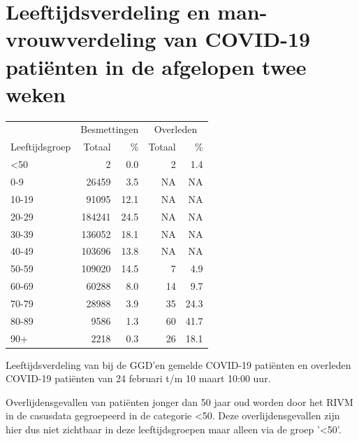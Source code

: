 \documentclass[
  english,
  man,floatsintext]{apa6}
\begin{document}
\newpage

\hypertarget{leeftijdsverdeling-en-man-vrouwverdeling-van-covid-19-patiuxebnten-in-de-afgelopen-twee-weken}{%
\section{Leeftijdsverdeling en man-vrouwverdeling van COVID-19 patiënten in de afgelopen twee weken}\label{leeftijdsverdeling-en-man-vrouwverdeling-van-covid-19-patiuxebnten-in-de-afgelopen-twee-weken}}

\begin{table}
\centering\begingroup\fontsize{11}{13}\selectfont

\begin{threeparttable}
\begin{tabular}{lrrrr}
\toprule
\multicolumn{1}{c}{ } & \multicolumn{2}{c}{Besmettingen} & \multicolumn{2}{c}{Overleden} \\
\cmidrule(l{3pt}r{3pt}){2-3} \cmidrule(l{3pt}r{3pt}){4-5}
Leeftijdsgroep & Totaal & \% & Totaal & \%\\
\midrule
<50 & 2 & 0.0 & 2 & 1.4\\
0-9 & 26459 & 3.5 & NA & NA\\
10-19 & 91095 & 12.1 & NA & NA\\
20-29 & 184241 & 24.5 & NA & NA\\
30-39 & 136052 & 18.1 & NA & NA\\
40-49 & 103696 & 13.8 & NA & NA\\
50-59 & 109020 & 14.5 & 7 & 4.9\\
60-69 & 60288 & 8.0 & 14 & 9.7\\
70-79 & 28988 & 3.9 & 35 & 24.3\\
80-89 & 9586 & 1.3 & 60 & 41.7\\
90+ & 2218 & 0.3 & 26 & 18.1\\
\bottomrule
\end{tabular}
\begin{tablenotes}
\item[1] Leeftijdsverdeling van bij de GGD’en gemelde COVID-19 patiënten en overleden COVID-19 patiënten van 24 februari t/m 10 maart 10:00 uur.
\item[2] Overlijdensgevallen van patiënten jonger dan 50 jaar oud worden door het RIVM in de casusdata gegroepeerd in de categorie <50. Deze overlijdensgevallen zijn hier dus niet zichtbaar in deze leeftijdsgroepen maar alleen via de groep '<50'.
\end{tablenotes}
\end{threeparttable}
\endgroup{}
\end{table}
\end{document}
